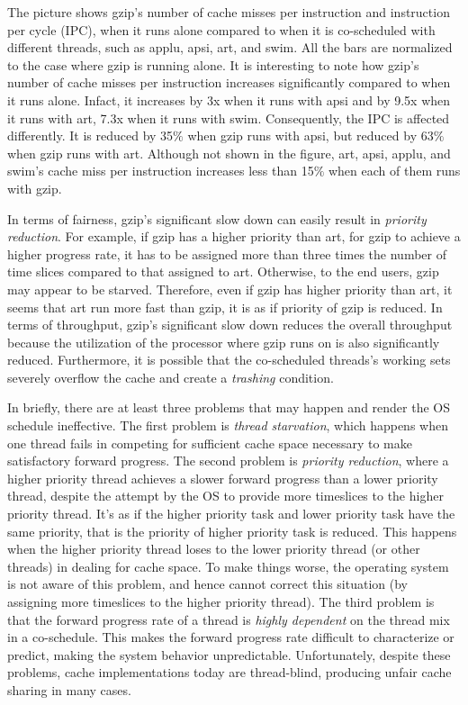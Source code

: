 The picture shows gzip's number of cache misses per instruction and instruction per cycle (IPC), when it runs alone compared to when it is
co-scheduled with different threads, such as applu, apsi, art, and swim. All the bars are normalized to the case where gzip is running alone.
It is interesting to note how gzip's number of cache misses per instruction increases significantly compared to when it runs alone. Infact, it increases 
by 3x when it runs with apsi and by 9.5x when it runs with art, 7.3x when it runs with swim.
Consequently, the IPC is affected differently. It is reduced by 35$\%$ when gzip runs with apsi, but reduced by 63$\%$ when gzip runs with art. 
Although not shown in the figure, art, apsi, applu, and swim's cache miss per instruction increases less than 15$\%$ when each of them runs with gzip. 

In terms of fairness, gzip's significant slow down can easily result in \textit{priority reduction}. 
For example, if gzip has a higher priority than art, for gzip to achieve a higher progress rate, it has to be assigned more than three times the 
number of time slices compared to that assigned to art. Otherwise, to the end users, gzip may appear to be starved. Therefore, even if gzip has higher 
priority than art, it seems that art run more fast than gzip, it is as if priority of gzip is reduced. In terms of throughput,
gzip's significant slow down reduces the overall throughput because the utilization of the processor where gzip runs on is also significantly reduced. 
Furthermore, it is possible that the co-scheduled threads's working sets severely overflow the cache and create a \textit{trashing} condition.

In briefly, there are at least three problems that may happen and render the OS schedule ineffective.
The first problem is \textit{thread starvation}, which happens when one thread fails in competing for sufficient cache space necessary to make 
satisfactory forward progress. The second problem is \textit{priority reduction}, where a higher priority thread achieves a slower forward
progress than a lower priority thread, despite the attempt by the OS to provide more timeslices to the higher priority thread. It's as if the higher 
priority task and lower priority task have the same priority, that is the priority of higher priority task is reduced.
This happens when the higher priority thread loses to the lower priority thread (or other threads) in dealing for cache space. 
To make things worse, the operating system is not aware of this problem, and hence cannot correct this situation (by assigning more timeslices to the 
higher priority thread). The third problem is that the forward progress rate of a thread is \textit{highly dependent} on the thread mix in a co-schedule. 
This makes the forward progress rate difficult to characterize or predict, making the system behavior unpredictable. Unfortunately, despite these problems, 
cache implementations today are thread-blind, producing unfair cache sharing in many cases.


